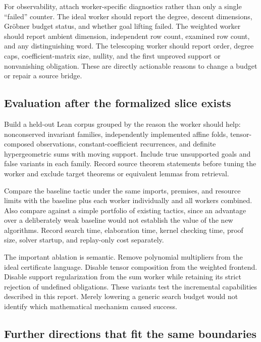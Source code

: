 For observability, attach worker-specific diagnostics rather than only a single
``failed'' counter. The ideal worker should report the degree, descent
dimensions, Gr\"obner budget status, and whether goal lifting failed. The
weighted worker should report ambient dimension, independent row count,
examined row count, and any distinguishing word. The telescoping worker should
report order, degree caps, coefficient-matrix size, nullity, and the first
unproved support or nonvanishing obligation. These are directly actionable
reasons to change a budget or repair a source bridge.

\subsection{Evaluation after the formalized slice exists}

Build a held-out Lean corpus grouped by the reason the worker should help:
nonconserved invariant families, independently implemented affine folds,
tensor-composed observations, constant-coefficient recurrences, and definite
hypergeometric sums with moving support. Include true unsupported goals and
false variants in each family. Record source theorem statements before tuning
the worker and exclude target theorems or equivalent lemmas from retrieval.

Compare the baseline tactic under the same imports, premises, and resource
limits with the baseline plus each worker individually and all workers
combined. Also compare against a simple portfolio of existing tactics, since
an advantage over a deliberately weak baseline would not establish the value
of the new algorithms. Record search time, elaboration time, kernel checking
time, proof size, solver startup, and replay-only cost separately.

The important ablation is semantic. Remove polynomial multipliers from the
ideal certificate language. Disable tensor composition from the weighted
frontend. Disable support regularization from the sum worker while retaining
its strict rejection of undefined obligations. These variants test the
incremental capabilities described in this report. Merely lowering a generic
search budget would not identify which mathematical mechanism caused success.

\subsection{Further directions that fit the same boundaries}

